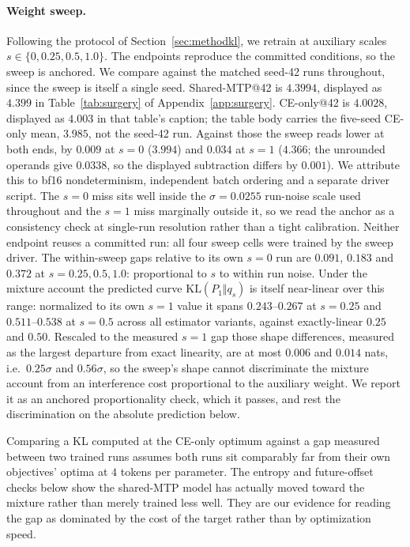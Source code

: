 \paragraph{Weight sweep.} Following the protocol of Section~\ref{sec:methodkl}, we
retrain at auxiliary scales $s \in \{0, 0.25, 0.5, 1.0\}$. The endpoints reproduce the committed
conditions, so the sweep is anchored. We compare against the matched seed-42 runs
throughout, since the sweep is itself a single seed. Shared-MTP@42 is $4.3994$,
displayed as $4.399$ in Table~\ref{tab:surgery} of
Appendix~\ref{app:surgery}. CE-only@42 is $4.0028$, displayed as $4.003$ in that
table's caption; the table body carries the five-seed CE-only mean, $3.985$,
not the seed-42 run. Against those the sweep reads lower at both ends, by
$0.009$ at $s{=}0$ ($3.994$) and $0.034$ at $s{=}1$ ($4.366$; the unrounded operands
give $0.0338$, so the displayed subtraction differs by $0.001$). We attribute this to
bf16 nondeterminism, independent batch ordering and a separate driver script. The
$s{=}0$ miss sits well inside the $\sigma = 0.0255$ run-noise scale used
throughout and the $s{=}1$ miss marginally outside it, so we read the anchor as a
consistency check at single-run resolution rather than a tight calibration.
Neither endpoint reuses a committed run: all four sweep cells were trained by the
sweep driver. The
within-sweep gaps relative to its own $s{=}0$ run are $0.091$, $0.183$ and $0.372$
at $s = 0.25, 0.5, 1.0$: proportional to $s$ to within run noise. Under the mixture
account the predicted curve $\mathrm{KL}(P_1 \Vert q_s)$ is itself near-linear
over this range: normalized to its own $s{=}1$ value it spans $0.243$--$0.267$ at
$s{=}0.25$ and $0.511$--$0.538$ at $s{=}0.5$ across all estimator variants, against
exactly-linear $0.25$ and $0.50$. Rescaled to the measured $s{=}1$ gap those
shape differences, measured as the largest departure from exact linearity, are at
most $0.006$ and $0.014$ nats, i.e.\ $0.25\sigma$ and $0.56\sigma$, so the sweep's shape cannot discriminate the mixture account from an
interference cost proportional to the auxiliary weight. We
report it as an anchored proportionality check, which it passes, and rest the
discrimination on the absolute prediction below.

Comparing a KL computed at the CE-only optimum against a gap measured between two
trained runs assumes both runs sit comparably far from their own objectives' optima
at $4$ tokens per parameter. The entropy and future-offset checks below show the shared-MTP model has actually moved toward the mixture rather than merely trained less well. They are our evidence for reading the gap as dominated by the cost of the target rather than by optimization speed.

